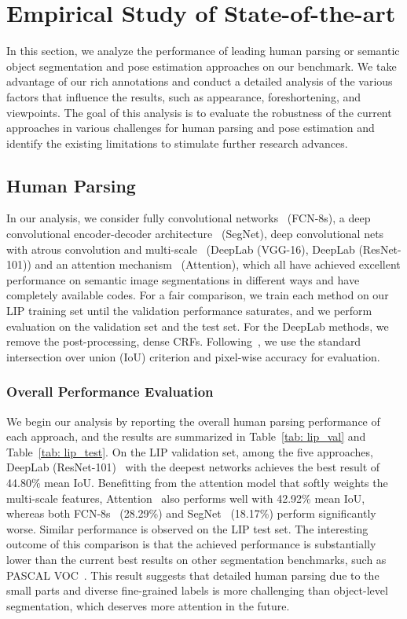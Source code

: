 \documentclass[10pt,journal,compsoc]{IEEEtran}
\begin{document}
\section{Empirical Study of State-of-the-art}
In this section, we analyze the performance of leading human parsing or semantic object segmentation and pose estimation approaches on our benchmark. We take advantage of our rich annotations and conduct a detailed analysis of the various factors that influence the results, such as appearance, foreshortening, and viewpoints. The goal of this analysis is to evaluate the robustness of the current approaches in various challenges for human parsing and pose estimation and identify the existing limitations to stimulate further research advances.

\subsection{Human Parsing}
In our analysis, we consider fully convolutional networks~\cite{long2014fully} (FCN-8s), a deep convolutional encoder-decoder architecture~\cite{badrinarayanan2015segnet} (SegNet), deep convolutional nets with atrous convolution and multi-scale~\cite{chen2016deeplab} (DeepLab (VGG-16), DeepLab (ResNet-101)) and an attention mechanism~\cite{chen2015attention} (Attention), which all have achieved excellent performance on semantic image segmentations in different ways and have completely available codes. For a fair comparison, we train each method on our LIP training set {until the validation performance saturates}, and we perform evaluation on the validation set and the test set. For the DeepLab methods, we remove the post-processing, dense CRFs. Following~\cite{chen2015attention,xia2015zoom}, we use the standard intersection over union (IoU) criterion and pixel-wise accuracy for evaluation.
\subsubsection{Overall Performance Evaluation}
We begin our analysis by reporting the overall human parsing performance of each approach, and the results are summarized in Table~\ref{tab: lip_val} and Table~\ref{tab: lip_test}. On the LIP validation set, among the five approaches, DeepLab (ResNet-101)~\cite{chen2016deeplab} with the deepest networks  achieves the best result of 44.80\% mean IoU. Benefitting from the attention model that softly weights the multi-scale features, Attention~\cite{chen2015attention} also performs well with 42.92\% mean IoU, whereas both FCN-8s~\cite{long2014fully} (28.29\%) and SegNet~\cite{badrinarayanan2015segnet} (18.17\%) perform significantly worse. 
Similar performance is observed on the LIP test set. The interesting outcome of this comparison is that the achieved performance is substantially lower than the current best results on other segmentation benchmarks, such as PASCAL VOC~\cite{everingham2012pascal}. This result suggests that detailed human parsing due to the small parts and diverse fine-grained labels is more challenging than object-level segmentation, which deserves more attention in the future.
\end{document}

